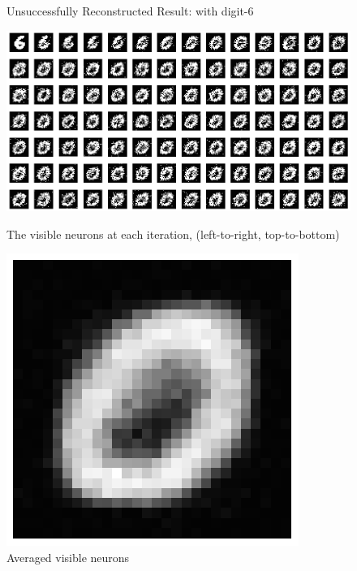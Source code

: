 \documentclass[12pt]{article}
\begin{document}
\newpage
\begin{figure}[ht]
	\begin{center}
		Unsuccessfully Reconstructed Result: with digit-6
	\end{center}
	\begin{minipage}[c]{0.55\linewidth}
	\centering
	\includegraphics[scale=.3]{../res/chgVisible3.png}
	\caption{The visible neurons at each iteration, (left-to-right, top-to-bottom)}
	\end{minipage}
	\hspace{4em}
	\begin{minipage}[c]{0.35\linewidth}
	\centering
	\vspace{-1em}
	\includegraphics[scale=.45]{../res/avgVisible3.png}
	\caption{Averaged visible neurons}
	\end{minipage}
\end{figure}
\end{document}
